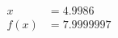 \documentclass[preview]{standalone}
\begin{document}
\begin{align*}
x &= 4.9986\\f(x) &= 7.9999997
\end{align*}
\end{document}
